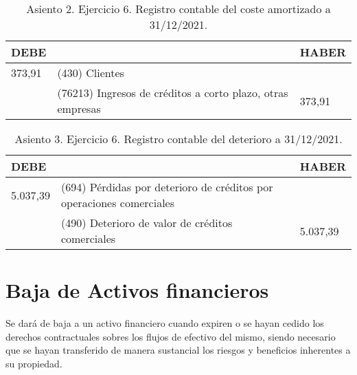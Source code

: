 \begin{table}[H]
    \centering
    \begin{tabular}{|p{3cm}|p{6cm}|p{3cm}|}
    \hline
    \rowcolor{blue!30}
    \textbf{DEBE} & \textbf{} & \textbf{HABER} \\
    \hline
    373,91 & (430) Clientes &  \\
    \hline
     & (76213) Ingresos de créditos a corto plazo, otras empresas & 373,91 \\
    \hline
    \end{tabular}
    \caption{Asiento 2. Ejercicio 6. Registro contable del coste amortizado a 31/12/2021.}
    \label{tabla:asiento2ej6}
\end{table}

\begin{table}[H]
    \centering
    \begin{tabular}{|p{3cm}|p{6cm}|p{3cm}|}
    \hline
    \rowcolor{blue!30}
    \textbf{DEBE} & \textbf{} & \textbf{HABER} \\
    \hline
    5.037,39 & (694) Pérdidas por deterioro de créditos por operaciones comerciales &  \\
    \hline
     & (490) Deterioro de valor de créditos comerciales & 5.037,39 \\
    \hline
    \end{tabular}
    \caption{Asiento 3. Ejercicio 6. Registro contable del deterioro a 31/12/2021.}
    \label{tabla:asiento3ej6}
\end{table}


















\newpage
\section{Baja de Activos financieros}

Se dará de baja a un activo financiero cuando expiren o se hayan cedido los derechos contractuales sobres los flujos de efectivo del mismo, siendo necesario que se hayan transferido de manera sustancial los riesgos y beneficios inherentes a su propiedad. 











